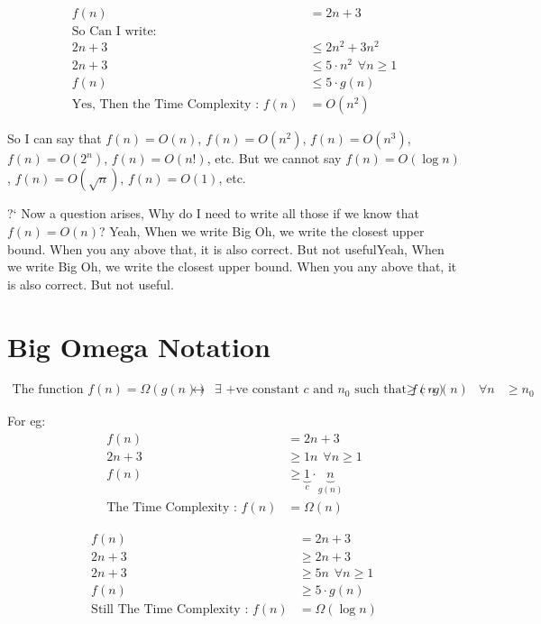 \documentclass{article}
\begin{document}
\[
\begin{aligned}
    f(n) &= 2n + 3 \\
    \text{So Can I write: }\\
        2n+3 &\leq 2n^2 + 3n^2\\ 
        2n+3 &\leq 5\cdot n^2 \hspace{5pt} \forall n \geq 1 \\
        f(n) &\leq 5 \cdot g(n) \\
        \text{Yes, Then the Time Complexity : } f(n) &= O(n^2)
\end{aligned}
\]

So I can say that $f(n) = O(n)$, $f(n) = O(n^2)$, $f(n) = O(n^3)$, $f(n) = O(2^n)$, $f(n) = O(n!)$, etc.
But we cannot say $f(n) = O(\log{n})$, $f(n) = O(\sqrt{n})$, $f(n) = O(1)$, etc.

?` Now a question arises, Why do I need to write all those if we know that $f(n) = O(n)$? 
Yeah, When we write Big Oh, we write the closest upper bound. When you any above that, it is also correct. But not usefulYeah, When we write Big Oh, we write the closest upper bound. When you any above that, it is also correct. But not useful.

\section{Big Omega Notation}
\[
\begin{aligned}
        \text{The function } f(n) = \Omega{(g(n))} &\leftrightarrow &\exists \text{ +ve constant $c$ and } 
        n_0 \text{ such that } f{(n)} &\geq c \cdot g{(n)} &\forall n &\geq n_0
\end{aligned}
\]

For eg:
\[
\begin{aligned}
        f(n) &= 2n + 3 \\
        2n+3 &\geq 1n \hspace{5pt} \forall n \geq 1 \\
        f(n) &\geq \underbrace{1}_c \cdot \underbrace{n}_{g(n)}\\
        \text{The Time Complexity : } f(n) &= \Omega(n)
\end{aligned}
\]

\[
\begin{aligned}
        f(n) &= 2n + 3 \\
        2n+3 &\geq 2n + 3 \\
        2n+3 &\geq 5n \hspace{5pt} \forall n \geq 1 \\
        f(n) &\geq 5 \cdot g(n) \\
        \text{Still The Time Complexity : } f(n) &= \Omega(\log{n})
\end{aligned}
\]
\end{document}
